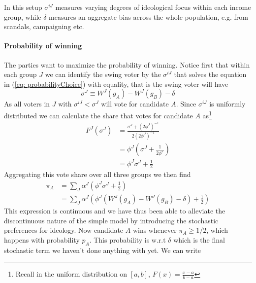 In this setup $\sigma^{iJ}$ measures varying degrees of ideological focus within each income group, while $\delta$ measures an aggregate bias across the whole population, e.g. from scandals, campaigning etc.

\paragraph{Probability of winning} The parties want to maximize the probability of winning. Notice first that within each group $J$ we can identify the swing voter by the $\sigma^{iJ}$ that solves the equation in (\ref{eq: probabilityChoice}) with equality, that is the swing voter will have 
\begin{equation}
    \sigma^J \equiv  W^J(g_A) - W^J(g_B)  - \delta
\end{equation}
As all voters in $J$ with $\sigma^{iJ} < \sigma^J$ will vote for candidate $A$. Since $\sigma^{iJ}$ is uniformly distributed we can calculate the share that votes for candidate $A$ as\footnote{Recall in the uniform distribution on $[a,b]$, $F(x)=\frac{x-a}{b-a}$} 
\begin{equation}
    \begin{split}
        F^J(\sigma^J) &= \frac{\sigma^J + (2\phi^J)^{-1}}{2(2\phi^J)^{-1}} \\ 
        &= \phi^J\left(\sigma^J + \frac{1}{2\phi^J} \right) \\ 
        &= \phi^J \sigma^J + \frac{1}{2}
    \end{split}
\end{equation}
Aggregating this vote share over all three groups we then find 
\begin{equation}
    \begin{split}
    \pi_A &= \sum_J \alpha^J \left(\phi^J \sigma^J + \frac{1}{2}\right) \\
    &=  \sum_J \alpha^J \left(\phi^J (W^J(g_A) - W^J(g_B)  - \delta) + \frac{1}{2}\right)
    \end{split}
\end{equation}
This expression is continuous and we have thus been able to alleviate the discontinuous nature of the simple model by introducing the stochastic preferences for ideology. Now candidate $A$ wins whenever $\pi_A\geq1/2$, which happens with probability $p_A$. This probability is w.r.t $\delta$ which is the final stochastic term we haven't done anything with yet. We can write 
